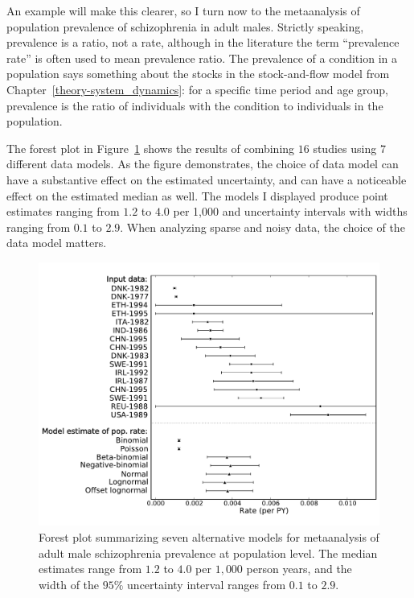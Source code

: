 An example will make this clearer, so I turn now to the metaanalysis
of population prevalence of schizophrenia in adult males.  Strictly
speaking, prevalence is a ratio, not a rate, although in the
literature the term ``prevalence rate'' is often used to mean
prevalence ratio.  The prevalence of a condition in a population says
something about the stocks in the stock-and-flow model from
Chapter~\ref{theory-system_dynamics}: for a specific time period and
age group, prevalence is the ratio of individuals with the condition
to individuals in the population.

The forest plot in Figure~\ref{rate-model-schiz-forest} shows the
results of combining $16$ studies using $7$ different data models.  As
the figure demonstrates, the choice of data model can have a
substantive effect on the estimated uncertainty, and can have a
noticeable effect on the estimated median as well. The models I
displayed produce point estimates ranging from $1.2$ to $4.0$ per
1,000 and uncertainty intervals with widths ranging from $0.1$ to
$2.9$.  When analyzing sparse and noisy data, the choice of the data model
matters.

\begin{figure}[h]
\begin{center}
\includegraphics[width=\textwidth]{schiz_forest.pdf}
\caption{Forest plot summarizing seven alternative models for
  metaanalysis of adult male schizophrenia prevalence at
  population level.  The median estimates range from
  $1.2$ to
  $4.0$ per $1,000$ person years, and the width of the
  $95\%$ uncertainty interval ranges from
  $0.1$ to
  $2.9$.}
\label{rate-model-schiz-forest}
\end{center}
\end{figure}

